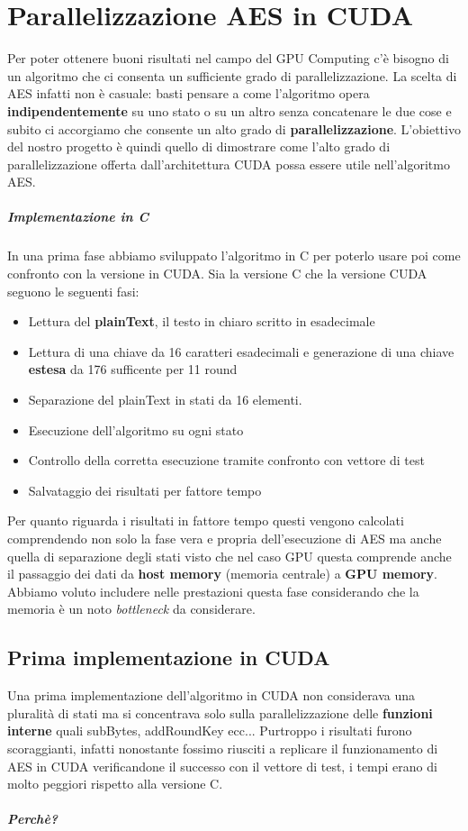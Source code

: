 \chapter{Parallelizzazione AES in CUDA}
Per poter ottenere buoni risultati nel campo del GPU Computing c'è bisogno di un algoritmo che ci consenta un sufficiente grado di parallelizzazione.
La scelta di AES infatti non è casuale: basti pensare a come l'algoritmo opera \textbf{indipendentemente} su uno stato o su un altro senza concatenare le due cose e subito ci accorgiamo che consente un alto grado di \textbf{parallelizzazione}.
L'obiettivo del nostro progetto è quindi quello di dimostrare come l'alto grado di parallelizzazione offerta dall'architettura CUDA possa essere utile nell'algoritmo AES. 

\paragraph{Implementazione in C}In una prima fase abbiamo sviluppato l'algoritmo in C per poterlo usare poi come confronto con la versione in CUDA. Sia la versione C che la versione CUDA seguono le seguenti fasi:
\begin{itemize}
\item Lettura del \textbf{plainText}, il testo in chiaro scritto in esadecimale
\item Lettura di una chiave da 16 caratteri esadecimali e generazione di una chiave \textbf{estesa} da 176 sufficente per 11 round
\item Separazione del plainText in stati da 16 elementi.
\item Esecuzione dell'algoritmo su ogni stato
\item Controllo della corretta esecuzione tramite confronto con vettore di test
\item Salvataggio dei risultati per fattore tempo
\end{itemize}

Per quanto riguarda i risultati in fattore tempo questi vengono calcolati comprendendo non solo la fase vera e propria dell'esecuzione di AES ma anche quella di separazione degli stati visto che nel caso GPU questa comprende anche il passaggio dei dati da \textbf{host memory} (memoria centrale) a \textbf{GPU memory}. Abbiamo voluto includere nelle prestazioni questa fase considerando che la memoria è un noto \textit{bottleneck} da considerare.

\section{Prima implementazione in CUDA}
Una prima implementazione dell'algoritmo in CUDA non considerava una pluralità di stati ma si concentrava solo sulla parallelizzazione delle \textbf{funzioni interne} quali subBytes, addRoundKey ecc...
Purtroppo i risultati furono scoraggianti, infatti nonostante fossimo riusciti a replicare il funzionamento di AES in CUDA verificandone il successo con il vettore di test, i tempi erano di molto peggiori rispetto alla versione C.
\paragraph{Perchè?} 


